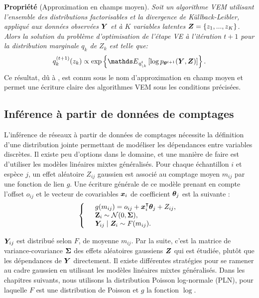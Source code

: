 \textbf{Propriété} (Approximation en champs moyen). \textit{Soit un algorithme VEM utilisant l'ensemble des distributions factorisables et la divergence de Küllback-Leibler, appliqué aux données observées ${\boldsymbol{Y}}$ et à  $K$ variables latentes ${\boldsymbol{Z}}=\{z_1,...,z_K\}$. Alors la solution du problème d'optimisation de l'étape VE à l'itération $t+1$ pour la distribution marginale $q_k$ de $Z_k$ est telle que:
$$ q_k^{(t+1)}(z_k)  \propto \exp \left\{ \Esp_{q_{\setminus k}^t} \left[ \log p_{\thetabf^{t+1}}(\Ybf, \Zbf) \right] \right\}.$$}
Ce résultat, dû à \citet{beal}, est connu sous le nom d'approximation en champ moyen et permet une écriture claire des algorithmes VEM sous les conditions précisées.

\subsection*{Inférence à partir de données de comptages}
L'inférence de réseaux à partir de données de comptages nécessite la définition d'une distribution jointe permettant de modéliser les dépendances entre variables discrètes. Il existe peu d'options dans le domaine, et une manière de faire est d'utiliser les modèles linéaires mixtes  généralisés. Pour chaque échantillon $i$ et espèce $j$, un effet aléatoire $Z_{ij}$ gaussien est associé au comptage moyen $m_{ij}$ par une fonction de lien $g$. Une écriture générale de ce modèle prenant en compte l'offset $o_{ij}$ et le vecteur de covariables ${\boldsymbol{x}}_i$ de coefficient ${\boldsymbol{\theta}}_j$ est la suivante :
 \begin{equation*}
 \left\{ \begin{array}{ll}
 &g(m_{ij}) = o_{ij}+{\boldsymbol{x}}_i^\intercal  {\boldsymbol{\theta}}_j + Z_{ij},\\
&{\bf Z}_i \sim \mathcal{N}(0, {\boldsymbol{\Sigma}}),\\
 &{\boldsymbol{Y}}_{ij}\mid{\boldsymbol{Z}}_i \sim F(m_{ij}).
 \end{array} \right. 
 \end{equation*}
 
${\boldsymbol{Y}}_{ij}$ est distribué selon $F$, de moyenne $m_{ij}$. Par la suite, c'est la matrice de variance-covariance  ${\boldsymbol{\Sigma}}$ des effets aléatoires gaussiens ${\boldsymbol{Z}}$ qui est étudiée, plutôt que les dépendances de ${\boldsymbol{Y}}$ directement. Il existe différentes stratégies pour se ramener au cadre gaussien en utilisant les modèles linéaires mixtes généralisés. Dans les chapitres suivants, nous utilisons la distribution Poisson log-normale (PLN), pour laquelle $F$ est une distribution de Poisson et $g$ la fonction $\log$.



